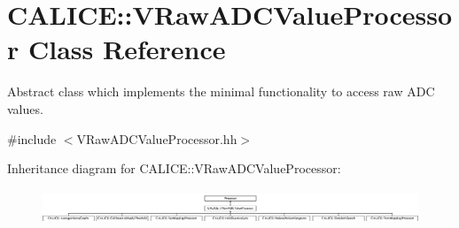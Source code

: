 \section{C\-A\-L\-I\-C\-E\-:\-:V\-Raw\-A\-D\-C\-Value\-Processor Class Reference}
\label{classCALICE_1_1VRawADCValueProcessor}


Abstract class which implements the minimal functionality to access raw A\-D\-C values.  




{\ttfamily \#include $<$V\-Raw\-A\-D\-C\-Value\-Processor.\-hh$>$}

Inheritance diagram for C\-A\-L\-I\-C\-E\-:\-:V\-Raw\-A\-D\-C\-Value\-Processor\-:\begin{figure}[H]
\begin{center}
\leavevmode
\includegraphics[height=1.025641cm]{classCALICE_1_1VRawADCValueProcessor}
\end{center}
\end{figure}
